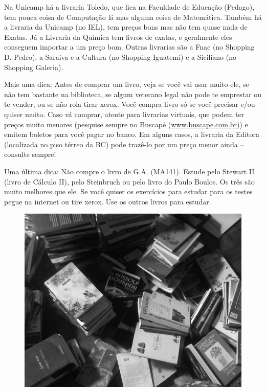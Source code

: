 Na Unicamp há a livraria Toledo, que fica na Faculdade de Educação (Pedago), tem
pouca coisa de Computação lá mas alguma coisa de Matemática. Também há
a livraria da Unicamp (no IEL), tem preços bons mas não tem quase nada de
Exatas. Já a Livraria da Química tem livros de exatas, e geralmente eles
conseguem importar a um preço bom. Outras livrarias são a Fnac (no Shopping D.
Pedro), a Saraiva e a Cultura (no Shopping Iguatemi) e a Siciliano (no Shopping
Galeria).

Mais uma dica: Antes de comprar um livro, veja se você vai usar muito ele, se
não tem bastante na biblioteca, se algum veterano legal não pode te emprestar ou
te vender, ou se não rola tirar xerox. Você compra livro só se você precisar
e/ou quiser muito. Caso vá comprar, atente para livrarias virtuais, que podem
ter preços muito menores (pesquise sempre no Buscapé
(\url{www.buscape.com.br})) e emitem boletos para você pagar no banco.
Em alguns casos, a livraria da Editora (localizada no piso térreo da BC) pode
trazê-lo por um preço menor ainda -- consulte sempre!

Uma última dica: Não compre o livro de G.A. (MA141). Estude pelo Stewart II
(livro de Cálculo II), pelo Steinbruch ou pelo livro do Paulo
Boulos. Os três são muito melhores que ele. Se você quiser os exercícios para
estudar para os testes pegue na internet ou tire xerox. Use os outros livros
para estudar.

\begin{figure}[h!]
    \centering
    \includegraphics[scale=0.29, keepaspectratio=true]{./img/imgs/9-outras_necessidades/-068.jpg}
\end{figure}


